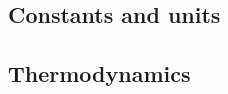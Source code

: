 \documentclass[10pt]{article}
\begin{document}
\raggedcolumns

\begin{multicols*}{1}

\subsection{Constants and units}


%

\subsection{Thermodynamics}


\end{multicols*}
\end{document}

